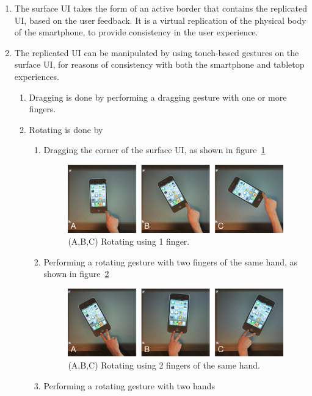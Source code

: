 \label{DD}
\begin{enumerate}[{DD}-1]
\item The surface UI takes the form of an active border that contains the replicated UI, based on the user feedback.
It is a virtual replication of the physical body of the smartphone, to provide consistency in the user experience.
\item The replicated UI can be manipulated by using touch-based gestures on the surface UI, for reasons of consistency with both the smartphone and tabletop experiences.
	\begin{enumerate}[{DD-2}a]
	\item Dragging is done by performing a dragging gesture with one or more fingers.
	\item Rotating is done by
		\begin{enumerate}[1{.}]
		\item Dragging the corner of the surface UI, as shown in figure~\ref{fig:sq1f}

\begin{figure}[htb]
  \centering
    \includegraphics[width=0.7\linewidth]{images/sq1f}
  \caption{(A,B,C) Rotating using 1 finger.}
  \label{fig:sq1f}
\end{figure}

		\item Performing a rotating gesture with two fingers of the same hand, as shown in figure~\ref{fig:sq2f1h}

\begin{figure}[htb]
  \centering
    \includegraphics[width=0.7\linewidth]{images/sq2f1h}
  \caption{(A,B,C) Rotating using 2 fingers of the same hand.}
  \label{fig:sq2f1h}
\end{figure}

		\item Performing a rotating gesture with two hands
		\end{enumerate}
\clearpage



\end{enumerate}
\end{enumerate}
